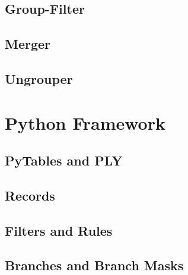  \subsection{Group-Filter}\label{subsec:group-filter}
 \subsection{Merger}\label{subsec:merger}
 \subsection{Ungrouper}\label{subsec:ungrouper}

\section{Python Framework}\label{sec:python-framework}
	\subsection{PyTables and PLY}\label{subsec:pytable-ply}
	\subsection{Records}\label{subsec:records}
	\subsection{Filters and Rules}\label{subsec:filters-rules}
	\subsection{Branches and Branch Masks}\label{subsec:branches-branchmasks}
